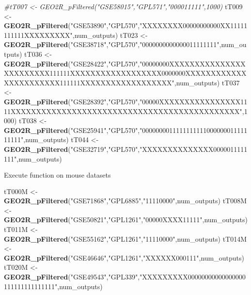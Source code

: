 \documentclass[
]{article}
\newenvironment{Shaded}{\begin{snugshade}}{\end{snugshade}}
\newcommand{\CommentTok}[1]{\textcolor[rgb]{0.56,0.35,0.01}{\textit{#1}}}
\newcommand{\DecValTok}[1]{\textcolor[rgb]{0.00,0.00,0.81}{#1}}
\newcommand{\KeywordTok}[1]{\textcolor[rgb]{0.13,0.29,0.53}{\textbf{#1}}}
\newcommand{\NormalTok}[1]{#1}
\newcommand{\StringTok}[1]{\textcolor[rgb]{0.31,0.60,0.02}{#1}}
\begin{document}
\begin{Shaded}
\begin{Highlighting}[]
\CommentTok{#tT007 <- GEO2R_pFiltered("GSE58015","GPL571","000011111",1000)}
\NormalTok{tT009 <-}\StringTok{ }\KeywordTok{GEO2R_pFiltered}\NormalTok{(}\StringTok{"GSE53890"}\NormalTok{,}\StringTok{"GPL570"}\NormalTok{,}\StringTok{"XXXXXXXX00000000000XX11111111111XXXXXXXXX"}\NormalTok{,num_outputs)}
\NormalTok{tT023 <-}\StringTok{ }\KeywordTok{GEO2R_pFiltered}\NormalTok{(}\StringTok{"GSE38718"}\NormalTok{,}\StringTok{"GPL570"}\NormalTok{,}\StringTok{"0000000000000011111111"}\NormalTok{,num_outputs)}
\NormalTok{tT036 <-}\StringTok{ }\KeywordTok{GEO2R_pFiltered}\NormalTok{(}\StringTok{"GSE28422"}\NormalTok{,}\StringTok{"GPL570"}\NormalTok{,}\StringTok{"00000000XXXXXXXXXXXXXXXXXXXXXXXX111111XXXXXXXXXXXXXXXXXX0000000XXXXXXXXXXXXXXXXXXXXXXX111111XXXXXXXXXXXXXXXXXX"}\NormalTok{,num_outputs)}
\NormalTok{tT037 <-}\StringTok{ }\KeywordTok{GEO2R_pFiltered}\NormalTok{(}\StringTok{"GSE28392"}\NormalTok{,}\StringTok{"GPL570"}\NormalTok{,}\StringTok{"00000XXXXXXXXXXXXXXXX1111XXXXXXXXXXXXXXXXXXXXXXXXXXXXXXXXXXXXXXXXXXXXX"}\NormalTok{,}\DecValTok{1000}\NormalTok{)}
\NormalTok{tT038 <-}\StringTok{ }\KeywordTok{GEO2R_pFiltered}\NormalTok{(}\StringTok{"GSE25941"}\NormalTok{,}\StringTok{"GPL570"}\NormalTok{,}\StringTok{"000000001111111111100000001111111111"}\NormalTok{,num_outputs)}
\NormalTok{tT044 <-}\StringTok{ }\KeywordTok{GEO2R_pFiltered}\NormalTok{(}\StringTok{"GSE32719"}\NormalTok{,}\StringTok{"GPL570"}\NormalTok{,}\StringTok{"XXXXXXXXXXXXXX0000011111111"}\NormalTok{,num_outputs)}
\end{Highlighting}
\end{Shaded}

Execute function on mouse datasets

\begin{Shaded}
\begin{Highlighting}[]
\NormalTok{tT000M <-}\StringTok{ }\KeywordTok{GEO2R_pFiltered}\NormalTok{(}\StringTok{"GSE71868"}\NormalTok{,}\StringTok{"GPL6885"}\NormalTok{,}\StringTok{"11110000"}\NormalTok{,num_outputs)}
\NormalTok{tT008M <-}\StringTok{ }\KeywordTok{GEO2R_pFiltered}\NormalTok{(}\StringTok{"GSE50821"}\NormalTok{,}\StringTok{"GPL1261"}\NormalTok{,}\StringTok{"00000XXXX11111"}\NormalTok{,num_outputs)}
\NormalTok{tT011M <-}\StringTok{ }\KeywordTok{GEO2R_pFiltered}\NormalTok{(}\StringTok{"GSE55162"}\NormalTok{,}\StringTok{"GPL1261"}\NormalTok{,}\StringTok{"11110000"}\NormalTok{,num_outputs)}
\NormalTok{tT014M <-}\StringTok{ }\KeywordTok{GEO2R_pFiltered}\NormalTok{(}\StringTok{"GSE46646"}\NormalTok{,}\StringTok{"GPL1261"}\NormalTok{,}\StringTok{"XXXXXX000111"}\NormalTok{,num_outputs)}
\NormalTok{tT020M <-}\StringTok{ }\KeywordTok{GEO2R_pFiltered}\NormalTok{(}\StringTok{"GSE49543"}\NormalTok{,}\StringTok{"GPL339"}\NormalTok{,}\StringTok{"XXXXXXXXX00000000000000000111111111111111"}\NormalTok{,num_outputs)}
\end{Highlighting}
\end{Shaded}
\end{document}
